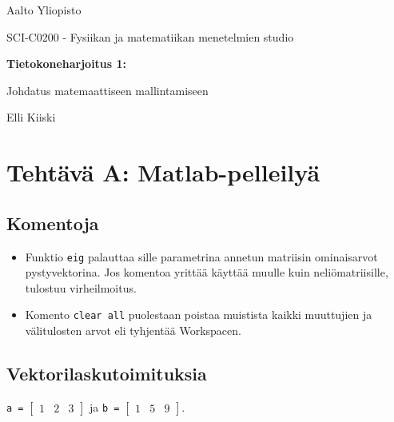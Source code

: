 \documentclass[a4paper,11pt]{article}
\begin{document}
{
\thispagestyle{empty}

{\large
Aalto Yliopisto
\par
SCI-C0200 - Fysiikan ja matematiikan menetelmien studio
}

\vspace{7cm}

{\huge \bf
Tietokoneharjoitus 1: 
\par
Johdatus matemaattiseen mallintamiseen}

\vspace{2cm}

{\Large Elli Kiiski}

\clearpage

\tableofcontents

\clearpage

\section{Tehtävä A: Matlab-pelleilyä} 		  

\subsection{Komentoja}

\begin{itemize}
	\item Funktio \texttt{eig} palauttaa sille parametrina annetun matriisin ominaisarvot pystyvektorina. 			Jos komentoa yrittää käyttää muulle kuin neliömatriisille, tulostuu virheilmoitus.
	\item Komento \texttt{clear all} puolestaan poistaa muistista kaikki muuttujien ja välitulosten arvot 		eli tyhjentää Workspacen.
\end{itemize}

\subsection{Vektorilaskutoimituksia}

\texttt{a =}
$\begin{bmatrix}
	1 & 2 & 3
\end{bmatrix}$
ja \texttt{b =}
$\begin{bmatrix}
	1 & 5 & 9
\end{bmatrix}$.

}
\end{document}
